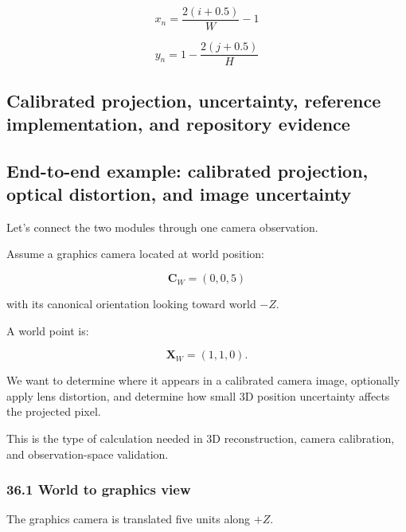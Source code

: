 \[
 \boxed{ x_n=\frac{2(i+0.5)}W-1 }
\]

\[
 \boxed{ y_n=1-\frac{2(j+0.5)}H }
\]

\subsection{Calibrated projection, uncertainty, reference implementation, and repository evidence}\label{02-foundations-ii-ch037-calibrated-projection-uncertainty-reference-implementation-and-repository-evidence}

\hypertarget{02-foundations-ii-ch037-calibrated-projection-uncertainty-reference-implementation-and-repository-evidence}{}

\subsection{End-to-end example: calibrated projection, optical distortion, and image uncertainty}\label{02-foundations-ii-ch037-end-to-end-example-calibrated-projection-optical-distortion-and-image-uncertainty}

\hypertarget{02-foundations-ii-ch037-end-to-end-example-calibrated-projection-optical-distortion-and-image-uncertainty}{}

Let's connect the two modules through one camera observation.

Assume a graphics camera located at world position:

\[
 \mathbf C_W=(0,0,5)
\]

with its canonical orientation looking toward world \(-Z\).

A world point is:

\[
 \mathbf X_W=(1,1,0).
\]

We want to determine where it appears in a calibrated camera image, optionally apply lens distortion, and determine how small 3D position uncertainty affects the projected pixel.

This is the type of calculation needed in 3D reconstruction, camera calibration, and observation-space validation.

\subsubsection{36.1 World to graphics view}\label{02-foundations-ii-ch037-world-to-graphics-view}

\hypertarget{02-foundations-ii-ch037-world-to-graphics-view}{}

The graphics camera is translated five units along \(+Z\).

